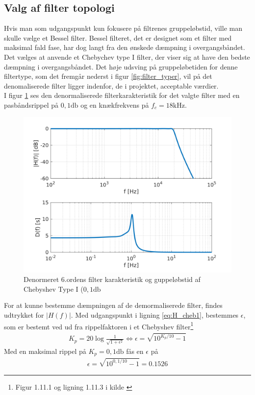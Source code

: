 \subsection{Valg af filter topologi}
Hvis man som udgangspunkt kun fokusere på filtrenes gruppeløbstid, ville man skulle vælge et Bessel filter.
Bessel filteret, det er designet som et filter med maksimal fald fase, har dog langt fra den ønskede dæmpning i overgangsbåndet.
Det vælges at anvende et Chebychev type I filter, der viser sig at have den bedste dæmpning i overgangsbåndet.
Det høje udsving på gruppeløbetiden for denne filtertype, som det fremgår nederst i figur \ref{fig:filter_typer}, vil på det denomaliserede filter ligger indenfor, de i projektet, acceptable værdier. 
\\
I figur \ref{fig:filter_cheb1_denorm} ses den denormaliserede filterkarakteristik for det valgte filter med en pasbåndsrippel på $0,1 \si{\decibel}$ og en knækfrekvens på $f_c = 18 \si{\kilo\hertz}$. 

\begin{figure}[h!]
	\centering
	\includegraphics[width=1\textwidth]{matlab/filter_cheb1_denorm.png}
	\caption{Denormeret 6.ordens filter karakteristik og guppeløbstid af Chebyshev Type I ($0,1 \si{\decibel}$}
	\label{fig:filter_cheb1_denorm}
\end{figure}

For at kunne bestemme dæmpningen af de demormaliserede filter, findes udtrykket for $|H(f)|$.
Med udgangspunkt i ligning \ref{eq:H_cheb1}, bestemmes $\epsilon$, som er bestemt ved ud fra rippelfaktoren i et Chebyshev filter\footnote{Figur 1.11.1 og ligning 1.11.3 i kilde \cite{anfilter}}
\begin{align}
	K_p = 20 \log \frac{1}{\sqrt{1+\epsilon^2}} \Leftrightarrow \epsilon = \sqrt{10^{K_p/10}-1}
\end{align}
Med en maksimal rippel på $K_p = 0,1 \si{\decibel}$ fås en $\epsilon$ på 
\begin{align}
	\epsilon = \sqrt{10^{0,1/10}-1} = \num{0.1526}
\end{align}

